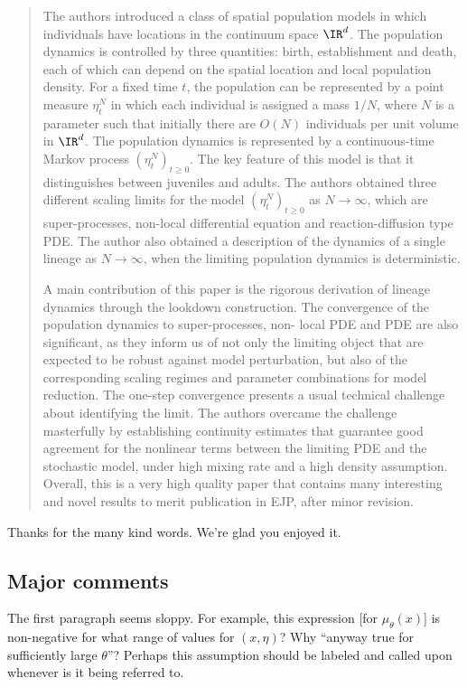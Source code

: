 
\begin{quote}
The authors introduced a class of spatial population models in which individuals have locations
in the continuum space $\IR^d$. The population dynamics is controlled by three quantities: birth,
establishment and death, each of which can depend on the spatial location and local population
density. For a fixed time $t$, the population can be represented by a point measure $\eta_t^N$ in which
each individual is assigned a mass $1/N$, where $N$ is a parameter such that initially there are $O(N)$
individuals per unit volume in $\IR^d$. The population dynamics is represented by a continuous-time
Markov process $(\eta_t^N)_{t\ge0}$. The key feature of this model is that it distinguishes between juveniles
and adults. The authors obtained three different scaling limits for the model $(\eta_t^N)_{t\ge0}$ as $N \to \infty$,
which are super-processes, non-local differential equation and reaction-diffusion type PDE. The
author also obtained a description of the dynamics of a single lineage as $N \to \infty$, when the
limiting population dynamics is deterministic.

A main contribution of this paper is the rigorous derivation of lineage dynamics through the
lookdown construction. The convergence of the population dynamics to super-processes, non-
local PDE and PDE are also significant, as they inform us of not only the limiting object that are
expected to be robust against model perturbation, but also of the corresponding scaling regimes
and parameter combinations for model reduction. The one-step convergence presents a usual technical
challenge about identifying the limit. The authors overcame the challenge masterfully by
establishing continuity estimates that guarantee good agreement for the nonlinear terms between
the limiting PDE and the stochastic model, under high mixing rate and a high density assumption.
Overall, this is a very high quality paper that contains many interesting and novel results to merit
publication in EJP, after minor revision.
\end{quote}

Thanks for the many kind words.
We're glad you enjoyed it.

\subsection*{Major comments}

\begin{point}{\revref}
The first paragraph seems sloppy. For example, this expression [for $\mu_\theta(x)$] is non-negative for
what range of values for $(x, \eta)$? Why ``anyway true for sufficiently large $\theta$''? Perhaps this
assumption should be labeled and called upon whenever is it being referred to.
\end{point}

